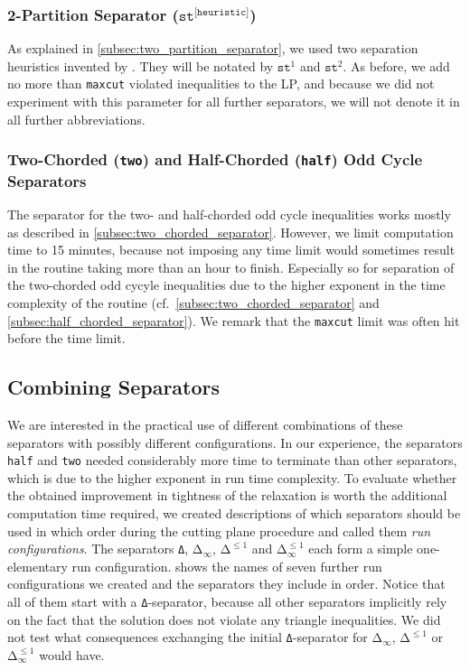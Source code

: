 \subsubsection{2-Partition Separator (\texorpdfstring{$\texttt{st}^{\texttt{[heuristic]}}$}{Δ})}
As explained in \cref{subsec:two_partition_separator}, we used two separation heuristics invented by \cite{grotschelCuttingPlaneAlgorithm1989}.
They will be notated by $\texttt{st}^{1}$ and $\texttt{st}^{2}$.
As before, we add no more than \texttt{maxcut} violated inequalities to the LP, and because we did not experiment with this parameter for all further separators, we will not denote it in all further abbreviations.

\subsubsection{Two-Chorded (\texttt{two}) and Half-Chorded (\texttt{half}) Odd Cycle Separators}
The separator for the two- and half-chorded odd cycle inequalities works mostly as described in \cref{subsec:two_chorded_separator}.
However, we limit computation time to 15 minutes, because not imposing any time limit would sometimes result in the routine taking more than an hour to finish.
Especially so for separation of the two-chorded odd cycyle inequalities due to the higher exponent in the time complexity of the routine (cf.\ \cref{subsec:two_chorded_separator} and \cref{subsec:half_chorded_separator}).
We remark that the \texttt{maxcut} limit was often hit before the time limit.

\subsection{Combining Separators}\label{subsec:run_configurations}
We are interested in the practical use of different combinations of these separators with possibly different configurations.
In our experience, the separators \texttt{half} and \texttt{two} needed considerably more time to terminate than other separators, which is due to the higher exponent in run time complexity.
To evaluate whether the obtained improvement in tightness of the relaxation is worth the additional computation time required,
we created descriptions of which separators should be used in which order during the cutting plane procedure and called them \textit{run configurations}.
The separators \texttt{Δ}, $\texttt{Δ}_{\infty}$, $\texttt{Δ}^{\leq 1}$ and $\texttt{Δ}_{\infty}^{\leq 1}$ each form a simple one-elementary run configuration.
 shows the names of seven further run configurations we created and the separators they include in order.
Notice that all of them start with a \texttt{Δ}-separator, because all other separators implicitly rely on the fact that the solution does not violate any triangle inequalities.
We did not test what consequences exchanging the initial \texttt{Δ}-separator for $\texttt{Δ}_{\infty}$, $\texttt{Δ}^{\leq 1}$ or $\texttt{Δ}_{\infty}^{\leq 1}$ would have.

